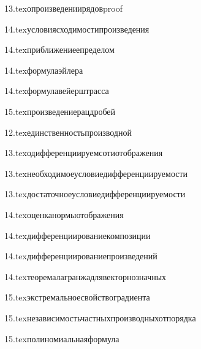 {13.tex}{опроизведениирядовproof}

{14.tex}{условиясходимостипроизведения}

{14.tex}{приближениеепределом}

{14.tex}{формулаэйлера}

{14.tex}{формулавейерштрасса}

{15.tex}{произведениерацдробей}

{12.tex}{единственностьпроизводной}

{13.tex}{одифференциируемсотиотображения}

{13.tex}{необходимоеусловиедифференциируемости}

{13.tex}{достаточноеусловиедифференциируемости}

{14.tex}{оценканормыотображения}

{14.tex}{дифференциированиекомпозиции}

{14.tex}{дифференциированиепроизведений}

{14.tex}{теоремалагранжадлявекторнозначных}

{15.tex}{экстремальноесвойствоградиента}

{15.tex}{независимостьчастныхпроизводныхотпорядка}

{15.tex}{полиномиальнаяформула}


